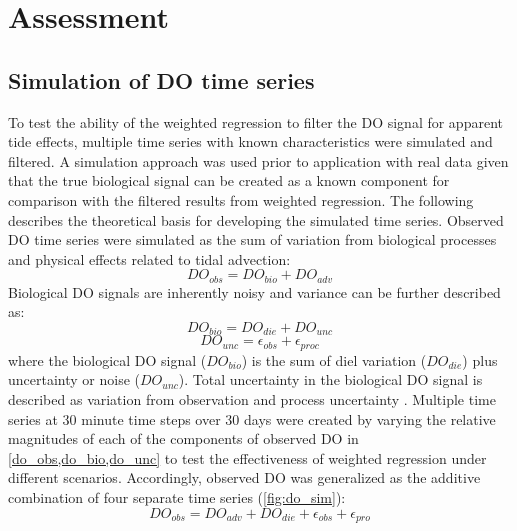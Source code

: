 \documentclass[letterpaper,12pt,oneside]{article}\usepackage[]{graphicx}\usepackage[]{color}
\begin{document}
\section{Assessment}

\subsection{Simulation of \ac{DO} time series}

To test the ability of the weighted regression to filter the \ac{DO} signal for apparent tide effects, multiple time series with known characteristics were simulated and filtered.  A simulation approach was used prior to application with real data given that the true biological signal can be created as a known component for comparison with the filtered results from weighted regression. The following describes the theoretical basis for developing the simulated time series.  Observed \ac{DO} time series were simulated as the sum of variation from biological processes and physical effects related to tidal advection:  
\begin{equation} \label{do_obs}
DO_{obs} = DO_{bio} + DO_{adv}
\end{equation}
Biological \ac{DO} signals are inherently noisy \citep{Batt12} and variance can be further described as:
\begin{equation} \label{do_bio} 
DO_{bio} = DO_{die} + DO_{unc}
\end{equation} 
\begin{equation} \label{do_unc}
DO_{unc} = \epsilon_{obs} + \epsilon_{proc}
\end{equation}
where the biological \ac{DO} signal ($DO_{bio}$) is the sum of diel variation ($DO_{die}$) plus uncertainty or noise ($DO_{unc}$).  Total uncertainty in the biological \ac{DO} signal is described as variation from observation and process uncertainty \citep[$\epsilon_{obs}$ and $\epsilon_{pro}$,][]{Hilborn97}.  Multiple time series at 30 minute time steps over 30 days were created by varying the relative magnitudes of each of the components of observed \ac{DO} in \cref{do_obs,do_bio,do_unc} to test the effectiveness of weighted regression under different scenarios.  Accordingly, observed \ac{DO} was generalized as the additive combination of four separate time series (\cref{fig:do_sim}):
\begin{equation} \label{do_obs_all}
DO_{obs} = DO_{adv} + DO_{die} + \epsilon_{obs} + \epsilon_{pro}
\end{equation} 
\end{document}
